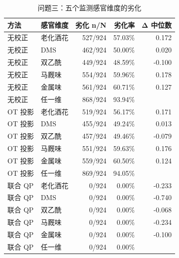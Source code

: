 \begin{table}[tbp]
\centering
\caption{问题三：五个监测感官维度的劣化}
\label{tab:t09_q3_defects}
\footnotesize
\setlength{\tabcolsep}{3.5pt}
\begin{tabular}{llrrr}
\toprule
方法 & 感官维度 & 劣化 n/N & 劣化率 & Δ 中位数 \\
\midrule
无校正 & 老化酒花 & 527/924 & 57.03\% & 0.172 \\
无校正 & DMS & 462/924 & 50.00\% & 0.020 \\
无校正 & 双乙酰 & 449/924 & 48.59\% & -0.100 \\
无校正 & 马厩味 & 554/924 & 59.96\% & 0.178 \\
无校正 & 金属味 & 561/924 & 60.71\% & 0.127 \\
无校正 & 任一维 & 868/924 & 93.94\% &  \\
OT 投影 & 老化酒花 & 519/924 & 56.17\% & 0.171 \\
OT 投影 & DMS & 455/924 & 49.24\% & 0.013 \\
OT 投影 & 双乙酰 & 457/924 & 49.46\% & -0.079 \\
OT 投影 & 马厩味 & 551/924 & 59.63\% & 0.176 \\
OT 投影 & 金属味 & 559/924 & 60.50\% & 0.124 \\
OT 投影 & 任一维 & 869/924 & 94.05\% &  \\
联合 QP & 老化酒花 & 0/924 & 0.00\% & -0.233 \\
联合 QP & DMS & 0/924 & 0.00\% & -0.740 \\
联合 QP & 双乙酰 & 0/924 & 0.00\% & -0.068 \\
联合 QP & 马厩味 & 0/924 & 0.00\% & -0.234 \\
联合 QP & 金属味 & 0/924 & 0.00\% & -0.100 \\
联合 QP & 任一维 & 0/924 & 0.00\% &  \\
\bottomrule
\end{tabular}
\end{table}
